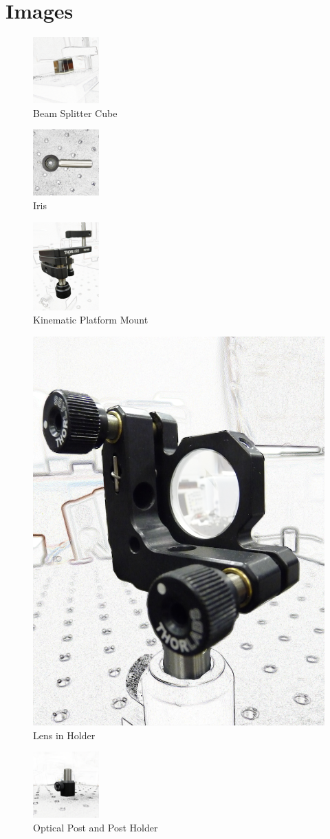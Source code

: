\section{Images}

\begin{figure}[ht]
\centering
\includegraphics[width=1in]{BeamSplitterCube}
\caption{Beam Splitter Cube}
\label{fig:beamsplittercube}
\end{figure}

\begin{figure}[ht]
\centering
\includegraphics[width=1in]{Iris}
\caption{Iris}
\label{fig:iris}
\end{figure}

\begin{figure}[ht]
\centering
\includegraphics[width=1in]{KinematicPlatformMount}
\caption{Kinematic Platform Mount}
\label{fig:kinematicplatformmount}
\end{figure}

\begin{figure}[ht]
\centering
\includegraphics[width=.8 in]{LensinHolder}
\caption{Lens in Holder}
\label{fig:lens}
\end{figure}

\begin{figure}[ht]
\centering
\includegraphics[width=1in]{OpticalPostwPostHolder}
\caption{Optical Post and Post Holder}
\label{fig:opticalpost_postholder}
\end{figure}

